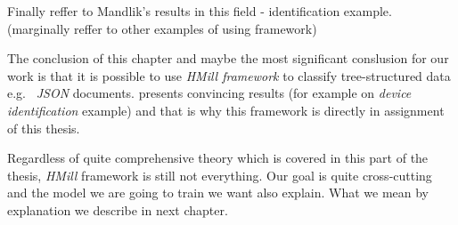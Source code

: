 Finally reffer to Mandlik's results in this field - identification example. (marginally reffer to other examples of using framework)


The conclusion of this chapter and maybe the most significant conslusion for our work is that it is possible to use \emph{HMill framework} to classify tree-structured data e.g. \ \emph{JSON} documents. \citeauthor{Mandlik2020} presents convincing results (for example on \emph{device identification} example) and that is why this framework is directly in assignment of this thesis.

Regardless of quite comprehensive theory which is covered in this part of the thesis, \emph{HMill} framework is still not everything. Our goal is quite cross-cutting and the model we are going to train we want also explain. What we mean by explanation we describe in next chapter.






